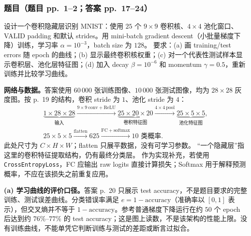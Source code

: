 \subsubsection*{题目（题目 pp.~1--2；答案 pp.~17--24）}
设计一个卷积隐藏层识别 MNIST：使用 $25$ 个 $9\times9$ 卷积核、$4\times4$ 池化窗口、VALID padding 和默认 strides。用 mini-batch gradient descent（小批量梯度下降）训练，学习率 $\alpha=10^{-3}$，batch size 为 $128$。
要求：(a) 画 training/test errors 随 epoch 的曲线；(b) 显示最终卷积核权重；(c) 对一个代表性测试样本显示卷积层、池化层特征图；(d) 加入 decay $\beta=10^{-6}$ 和 momentum $\gamma=0.5$，重新训练并比较学习曲线。

\begin{workedsolution}
\textbf{网络与数据。}答案使用 $60\,000$ 张训练图像、$10\,000$ 张测试图像，均为 $28\times28$ 灰度图。按 p.~19 的结构，卷积 stride 为 $1$、池化 stride 为 $4$：
\begin{gather*}
\underbrace{1\times28\times28}_{\text{输入}}
\xrightarrow{9\times9\ \mathrm{conv}+\mathrm{ReLU}}
\underbrace{25\times20\times20}_{\text{卷积特征图}}
\xrightarrow{4\times4\ \mathrm{pool}}
\underbrace{25\times5\times5}_{\text{池化特征图}},\\
25\times5\times5\xrightarrow{\mathrm{flatten}}625
\xrightarrow{\mathrm{FC}+\mathrm{softmax}}10\text{ 类概率}.
\end{gather*}
此处尺寸为 $C\times H\times W$；flatten 只展平数据，没有可学习参数。
“一个隐藏层”指这里的卷积特征提取结构，仍有最终分类层。
作为实现补充，若使用 \texttt{CrossEntropyLoss}，FC 应输出 raw logits 直接计算损失；Softmax 用于解释预测概率，不应在该损失之前重复应用。

\textbf{(a) 学习曲线的评价口径。}答案 p.~20 只展示 test accuracy，不是题目要求的完整训练、测试误差曲线。分类错误率满足 $e=1-\mathrm{accuracy}$（准确率以 $[0,1]$ 表示），但交叉熵并不等于 $1-\mathrm{accuracy}$。参考普通梯度下降运行在约 $50$ 个 epoch 后达到约 $76\%$--$77\%$ 的 test accuracy；这是图上读数，不是该架构的性能上限。没有训练曲线，不能单凭它判断训练与测试的差距或断言过拟合。


\end{workedsolution}
